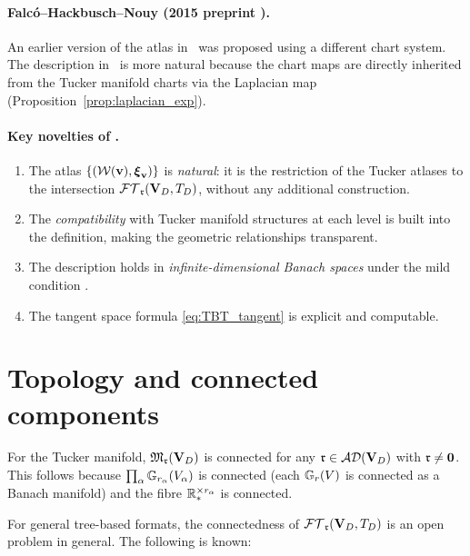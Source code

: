 \paragraph{Falcó--Hackbusch--Nouy (2015 preprint \cite{FHN2015}).}
An earlier version of the atlas in~\cite{FHN2023} was proposed
using a different chart system. The description in~\cite{FHN2023}
is more natural because the chart maps are directly inherited from
the Tucker manifold charts via the Laplacian map (Proposition~\ref{prop:laplacian_exp}).

\paragraph{Key novelties of \cite{FHN2023}.}
\begin{enumerate}
\item The atlas $\{(\mathcal{W}(\mathbf{v}), \boldsymbol{\xi}_{\mathbf{v}})\}$
    is \emph{natural}: it is the restriction of the Tucker atlases
    to the intersection $\mathcal{FT}_{\mathfrak{r}}(\mathbf{V}_D,T_D)$, without any additional construction.
\item The \emph{compatibility} with Tucker manifold structures at
    each level is built into the definition, making the geometric
    relationships transparent.
\item The description holds in \emph{infinite-dimensional Banach
    spaces} under the mild condition \condINJ.
\item The tangent space formula \eqref{eq:TBT_tangent} is explicit
    and computable.
\end{enumerate}

\section{Topology and connected components}
\label{sec:TB_manifold:topology}

\begin{proposition}
\label{prop:TBT_connected}
For the Tucker manifold, $\mathfrak{M}_{\mathfrak{r}}(\mathbf{V}_D)$ is connected for any
$\mathfrak{r} \in \mathcal{AD}(\mathbf{V}_D)$ with $\mathfrak{r} \neq \mathbf{0}$. This follows because
$\prod_\alpha \mathbb{G}_{r_\alpha}(V_\alpha)$ is connected (each
$\mathbb{G}_{r}(V)$ is connected as a Banach manifold) and the fibre
$\mathbb{R}^{\times r_\alpha}_*$ is connected.
\end{proposition}

For general tree-based formats, the connectedness of $\mathcal{FT}_{\mathfrak{r}}(\mathbf{V}_D,T_D)$ is an
open problem in general. The following is known:

